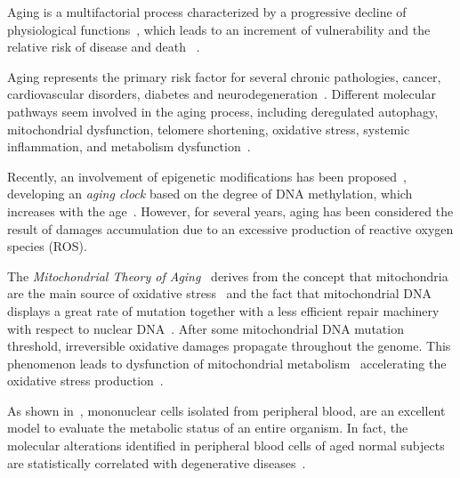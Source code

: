 Aging is a multifactorial process characterized by a progressive decline of physiological functions~\cite{campisi2013aging}, which leads to an increment of vulnerability and the relative risk of disease and death ~\cite{bratic2010mitochondrial}.

Aging represents the primary risk factor for several chronic pathologies, \ie cancer, cardiovascular disorders, diabetes and neurodegeneration~\cite{lopez2013hallmarks}. Different molecular pathways seem involved in the aging process, including deregulated autophagy, mitochondrial dysfunction, telomere shortening, oxidative stress, systemic inflammation, and metabolism dysfunction~\cite{lopez2013hallmarks, riera2016signaling}.

Recently, an involvement of epigenetic modifications has been proposed~\cite{thompson2017epigenetic}, developing an \textit{aging clock} based on the degree of DNA methylation, which increases with the age~\cite{horvath2013dna}. However, for several years, aging has been considered the result of damages accumulation due to an excessive production of reactive oxygen species (ROS).

The \textit{Mitochondrial Theory of Aging}~\cite{harman1972biologic, sastre2000mitochondrial} derives from the  concept that mitochondria are the main source of oxidative stress~\cite{cadenas2000mitochondrial, turrens2003mitochondrial, dai2014mitochondrial} and the fact that mitochondrial DNA displays a
great rate of mutation together with a less efficient repair machinery with respect to nuclear DNA~\cite{short2005decline}. After some mitochondrial DNA mutation threshold, irreversible oxidative damages propagate throughout the genome. This phenomenon leads to dysfunction of mitochondrial metabolism~\cite{genova2004mitochondrial} accelerating the oxidative stress production~\cite{wallace2010mitochondrial}.

As shown in~\cite{mckerrell2015leukemia}, mononuclear cells isolated from peripheral blood, are an excellent model to evaluate the metabolic status of an entire organism. In fact, the molecular alterations identified in peripheral blood cells of aged normal subjects are statistically correlated with degenerative diseases~\cite{jaiswal2014age}.


